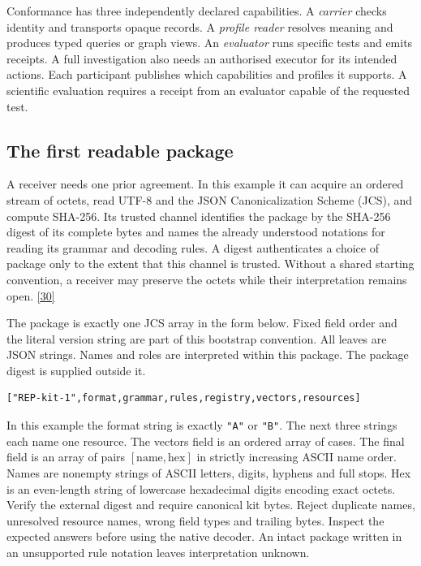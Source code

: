 \documentclass[11pt,a4paper]{article}
\newcommand{\topic}[1]{\par\smallskip{\sffamily\bfseries\color{ink}#1\par}\nobreak}
\newcommand{\src}[1]{\hyperlink{ref#1}{[#1]}}
\begin{document}
Conformance has three independently declared capabilities. A \emph{carrier} checks identity and transports opaque records. A \emph{profile reader} resolves meaning and produces typed queries or graph views. An \emph{evaluator} runs specific tests and emits receipts. A full investigation also needs an authorised executor for its intended actions. Each participant publishes which capabilities and profiles it supports. A scientific evaluation requires a receipt from an evaluator capable of the requested test.

\clearpage
{}
\subsection*{The first readable package}\label{sec:kit}
A receiver needs one prior agreement. In this example it can acquire an ordered stream of octets, read UTF-8 and the JSON Canonicalization Scheme (JCS), and compute SHA-256. Its trusted channel identifies the package by the SHA-256 digest of its complete bytes and names the already understood notations for reading its grammar and decoding rules. A digest authenticates a choice of package only to the extent that this channel is trusted. Without a shared starting convention, a receiver may preserve the octets while their interpretation remains open. \src{30}

\topic{Package layout}
The package is exactly one JCS array in the form below. Fixed field order and the literal version string are part of this bootstrap convention. All leaves are JSON strings. Names and roles are interpreted within this package. The package digest is supplied outside it.
\begin{small}
\begin{verbatim}
["REP-kit-1",format,grammar,rules,registry,vectors,resources]
\end{verbatim}
\end{small}
In this example the format string is exactly \texttt{"A"} or \texttt{"B"}. The next three strings each name one resource. The vectors field is an ordered array of cases. The final field is an array of pairs $[\mathrm{name},\mathrm{hex}]$ in strictly increasing ASCII name order. Names are nonempty strings of ASCII letters, digits, hyphens and full stops. Hex is an even-length string of lowercase hexadecimal digits encoding exact octets. Verify the external digest and require canonical kit bytes. Reject duplicate names, unresolved resource names, wrong field types and trailing bytes. Inspect the expected answers before using the native decoder. An intact package written in an unsupported rule notation leaves interpretation unknown.
\end{document}
